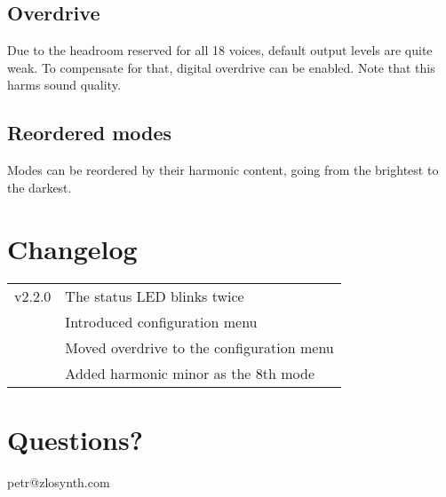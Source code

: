 \documentclass[10pt,nofoldmark,nocombine]{leaflet} %
\begin{document}
\subsection{Overdrive}

Due to the headroom reserved for all 18 voices, default output levels are quite weak. To compensate for that, digital overdrive can be enabled. Note that this harms sound quality.

\subsection{Reordered modes}

Modes can be reordered by their harmonic content, going from the brightest to the darkest.

\section{Changelog}

\begin{tabular}{@{}rl@{}}
  v2.2.0 & The status LED blinks twice \\
         & Introduced configuration menu \\
         & Moved overdrive to the configuration menu \\
         & Added harmonic minor as the 8th mode
\end{tabular}

\section{Questions?}

\begin{center}
petr@zlosynth.com
\end{center}
\end{document}
